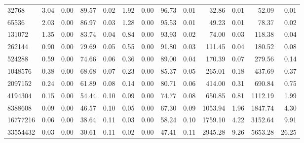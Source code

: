 \begin{tabular}{lrrrrrrrrrrrr}
32768      &        3.04 &        0.00 &         89.57 &          0.02 &           1.92 &           0.00 &        96.73 &         0.01 &            32.86 &             0.01 &           52.09 &            0.01 \\
65536      &        2.03 &        0.00 &         86.97 &          0.03 &           1.28 &           0.00 &        95.53 &         0.01 &            49.23 &             0.01 &           78.37 &            0.02 \\
131072     &        1.35 &        0.00 &         83.74 &          0.04 &           0.84 &           0.00 &        93.93 &         0.02 &            74.00 &             0.03 &          118.38 &            0.04 \\
262144     &        0.90 &        0.00 &         79.69 &          0.05 &           0.55 &           0.00 &        91.80 &         0.03 &           111.45 &             0.04 &          180.52 &            0.08 \\
524288     &        0.59 &        0.00 &         74.66 &          0.06 &           0.36 &           0.00 &        89.00 &         0.04 &           170.39 &             0.07 &          279.56 &            0.14 \\
1048576    &        0.38 &        0.00 &         68.68 &          0.07 &           0.23 &           0.00 &        85.37 &         0.05 &           265.01 &             0.18 &          437.69 &            0.37 \\
2097152    &        0.24 &        0.00 &         61.89 &          0.08 &           0.14 &           0.00 &        80.71 &         0.06 &           414.00 &             0.31 &          690.84 &            0.75 \\
4194304    &        0.15 &        0.00 &         54.44 &          0.10 &           0.09 &           0.00 &        74.77 &         0.08 &           650.85 &             0.81 &         1112.19 &            1.99 \\
8388608    &        0.09 &        0.00 &         46.57 &          0.10 &           0.05 &           0.00 &        67.30 &         0.09 &          1053.94 &             1.96 &         1847.74 &            4.30 \\
16777216   &        0.06 &        0.00 &         38.64 &          0.11 &           0.03 &           0.00 &        58.24 &         0.10 &          1759.10 &             4.22 &         3152.64 &            9.91 \\
33554432   &        0.03 &        0.00 &         30.61 &          0.11 &           0.02 &           0.00 &        47.41 &         0.11 &          2945.28 &             9.26 &         5653.28 &           26.25 \\

\end{tabular}
